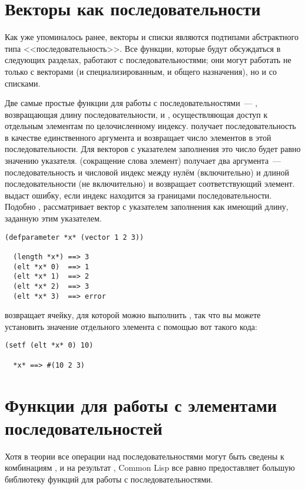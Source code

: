 \section{Векторы как последовательности}

Как уже упоминалось ранее, векторы и списки являются подтипами абстрактного типа
<<последовательность>>.  Все функции, которые будут обсуждаться в следующих разделах,
работают с последовательностями; они могут работать не только с векторами (и
специализированным, и общего назначения), но и со списками.

Две самые простые функции для работы с последовательностями~--- ,
возвращающая длину последовательности, и , осуществляющая доступ к
отдельным элементам по целочисленному индексу.   получает
последовательность в качестве единственного аргумента и возвращает число элементов в этой
последовательности.  Для векторов с указателем заполнения это число будет равно значению
указателя.  (сокращение слова элемент) получает два аргумента~---
последовательность и числовой индекс между нулём (включительно) и длиной
последовательности (не включительно) и возвращает соответствующий элемент.   выдаст ошибку,
если индекс находится за границами последовательности.  Подобно , 
рассматривает вектор с указателем заполнения как имеющий длину, заданную этим
указателем.

\begin{lstlisting}[style=lisprepl]
  (defparameter *x* (vector 1 2 3))
  
  (length *x*) ==> 3
  (elt *x* 0)  ==> 1
  (elt *x* 1)  ==> 2
  (elt *x* 2)  ==> 3
  (elt *x* 3)  ==> error
\end{lstlisting}

 возвращает ячейку, для которой можно выполнить , так что вы можете
установить значение отдельного элемента с помощью вот такого кода:

\begin{lstlisting}[style=lisprepl]
  (setf (elt *x* 0) 10)
  
  *x* ==> #(10 2 3)
\end{lstlisting}

\section{Функции для работы с элементами последовательностей}

Хотя в теории все операции над последовательностями могут быть сведены к комбинациям
,  и  на результат , Common Lisp все равно
предоставляет большую библиотеку функций для работы с последовательностями.

